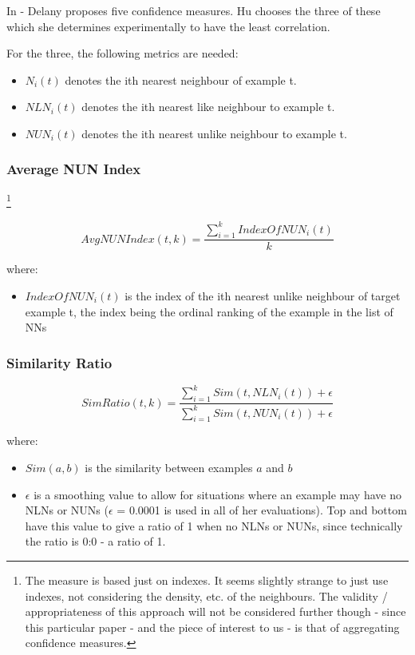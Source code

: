 \documentclass[a4paper,11pt]{report}
\begin{document}
In \citet{Delany2005} - Delany proposes five confidence measures. Hu chooses the three of these which she determines experimentally to have the least correlation.

For the three, the following metrics are needed:
\begin{itemize} 
	\item $N_{i}(t)$ denotes the ith nearest neighbour of example t.
	\item $NLN_{i}(t)$ denotes the ith nearest like neighbour to example t.
	\item $NUN_{i}(t)$ denotes the ith nearest unlike neighbour to example t.
\end{itemize}
\subsubsection{Average NUN Index} \footnote{The measure is based just on indexes. It seems slightly strange to just use indexes, not considering the density, etc. of the neighbours. The validity / appropriateness of this approach will not be considered further though - since this particular paper - and the piece of interest to us - is that of aggregating confidence measures.}

\[
AvgNUNIndex(t,k)=\frac{\sum_{i=1}^{k}IndexOfNUN_{i}(t)}{k}
\]

where:
\begin{itemize}
	\item $IndexOfNUN_{i}(t)$ is the index of the ith nearest unlike neighbour of target example t, the index being the ordinal ranking of the example in the list of NNs
\end{itemize}

\subsubsection{Similarity Ratio}
\[
SimRatio(t,k)=\frac{\sum_{i=1}^{k}Sim(t,NLN_{i}(t))+\epsilon}{\sum_{i=1}^{k}Sim(t,NUN_{i}(t))+\epsilon}
\]

where:
\begin{itemize}
	\item $Sim(a, b)$ is the similarity between examples $a$ and $b$ 
	\item $\epsilon$ is a smoothing value to allow for situations where an example may have no NLNs or NUNs ($\epsilon$ = 0.0001 is used in all of her evaluations). Top and bottom have this value to give a ratio of 1 when no NLNs or NUNs, since technically the ratio is 0:0 - a ratio of 1.
\end{itemize}
\end{document}
